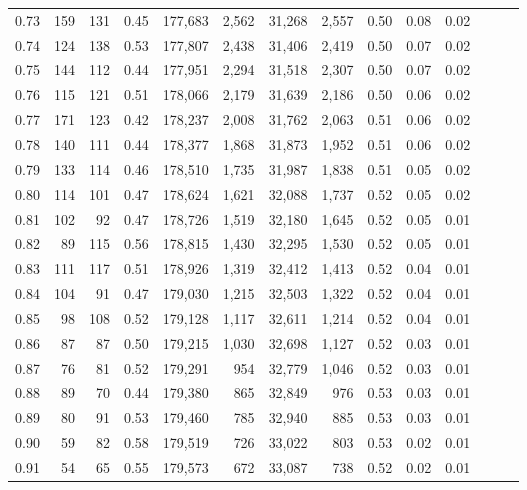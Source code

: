\begin{tabular}{rrrrrrrrrrrrrr}
0.73 &    159 &  131 &  0.45 &  177,683 &    2,562 &  31,268 &   2,557 &  0.50 &  0.08 &      0.02 \\
0.74 &    124 &  138 &  0.53 &  177,807 &    2,438 &  31,406 &   2,419 &  0.50 &  0.07 &      0.02 \\
0.75 &    144 &  112 &  0.44 &  177,951 &    2,294 &  31,518 &   2,307 &  0.50 &  0.07 &      0.02 \\
0.76 &    115 &  121 &  0.51 &  178,066 &    2,179 &  31,639 &   2,186 &  0.50 &  0.06 &      0.02 \\
0.77 &    171 &  123 &  0.42 &  178,237 &    2,008 &  31,762 &   2,063 &  0.51 &  0.06 &      0.02 \\
0.78 &    140 &  111 &  0.44 &  178,377 &    1,868 &  31,873 &   1,952 &  0.51 &  0.06 &      0.02 \\
0.79 &    133 &  114 &  0.46 &  178,510 &    1,735 &  31,987 &   1,838 &  0.51 &  0.05 &      0.02 \\
0.80 &    114 &  101 &  0.47 &  178,624 &    1,621 &  32,088 &   1,737 &  0.52 &  0.05 &      0.02 \\
0.81 &    102 &   92 &  0.47 &  178,726 &    1,519 &  32,180 &   1,645 &  0.52 &  0.05 &      0.01 \\
0.82 &     89 &  115 &  0.56 &  178,815 &    1,430 &  32,295 &   1,530 &  0.52 &  0.05 &      0.01 \\
0.83 &    111 &  117 &  0.51 &  178,926 &    1,319 &  32,412 &   1,413 &  0.52 &  0.04 &      0.01 \\
0.84 &    104 &   91 &  0.47 &  179,030 &    1,215 &  32,503 &   1,322 &  0.52 &  0.04 &      0.01 \\
0.85 &     98 &  108 &  0.52 &  179,128 &    1,117 &  32,611 &   1,214 &  0.52 &  0.04 &      0.01 \\
0.86 &     87 &   87 &  0.50 &  179,215 &    1,030 &  32,698 &   1,127 &  0.52 &  0.03 &      0.01 \\
0.87 &     76 &   81 &  0.52 &  179,291 &      954 &  32,779 &   1,046 &  0.52 &  0.03 &      0.01 \\
0.88 &     89 &   70 &  0.44 &  179,380 &      865 &  32,849 &     976 &  0.53 &  0.03 &      0.01 \\
0.89 &     80 &   91 &  0.53 &  179,460 &      785 &  32,940 &     885 &  0.53 &  0.03 &      0.01 \\
0.90 &     59 &   82 &  0.58 &  179,519 &      726 &  33,022 &     803 &  0.53 &  0.02 &      0.01 \\
0.91 &     54 &   65 &  0.55 &  179,573 &      672 &  33,087 &     738 &  0.52 &  0.02 &      0.01 \\

\end{tabular}
